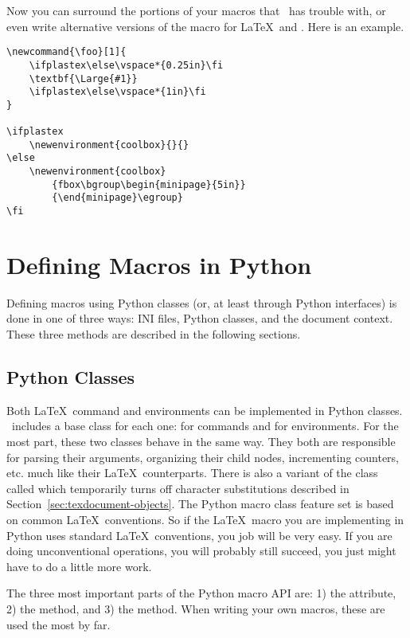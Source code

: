 Now you can surround the portions of your macros that \plasTeX\ has
trouble with, or even write alternative versions of the macro for
\LaTeX\ and \plasTeX.  Here is an example.
\begin{verbatim}
\newcommand{\foo}[1]{
    \ifplastex\else\vspace*{0.25in}\fi
    \textbf{\Large{#1}}
    \ifplastex\else\vspace*{1in}\fi
}

\ifplastex
    \newenvironment{coolbox}{}{}
\else
    \newenvironment{coolbox}
        {fbox\bgroup\begin{minipage}{5in}}
        {\end{minipage}\egroup}
\fi
\end{verbatim}


\section{Defining Macros in Python}

Defining macros using Python classes (or, at least through Python interfaces)
is done in one of three ways: INI files, Python classes, and the document
context.  These three methods are described in the following sections.


\subsection{Python Classes\label{sec:macroclasses}}

Both \LaTeX\ command and environments can be implemented in Python
classes.  \plasTeX\ includes a base class for each one: 
for commands and  for environments.  For the most
part, these two classes behave in the same way.  They both are
responsible for parsing their arguments, organizing their child nodes,
incrementing counters, etc. much like their \LaTeX\ counterparts.
There is also a variant of the  class called
 which temporarily turns off character
substitutions described in Section~\ref{sec:texdocument-objects}.
The Python macro class feature set is based on common \LaTeX\
conventions.  So if the \LaTeX\ macro you are implementing in Python
uses standard \LaTeX\ conventions, you job will be very easy.  If you
are doing unconventional operations, you will probably still succeed,
you just might have to do a little more work.

The three most important parts of the Python macro API are: 1) the
\member{args} attribute, 2) the \method{invoke} method, and 3) the
\member{digest} method.  When writing your own macros, these are
used the most by far.

